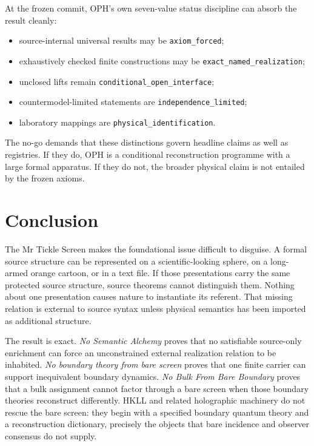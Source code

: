 \documentclass[10pt,a4paper]{article}
\theoremstyle{definition}
\theoremstyle{remark}
\begin{document}
At the frozen commit, OPH's own seven-value status discipline can absorb the
result cleanly:

\begin{itemize}
\item source-internal universal results may be \texttt{axiom\_forced};
\item exhaustively checked finite constructions may be
\texttt{exact\_named\_realization};
\item unclosed lifts remain \texttt{conditional\_open\_interface};
\item countermodel-limited statements are \texttt{independence\_limited};
\item laboratory mappings are \texttt{physical\_identification}.
\end{itemize}

The no-go demands that these distinctions govern headline claims as well as
registries.  If they do, OPH is a conditional reconstruction programme with a
large formal apparatus.  If they do not, the broader physical claim is not
entailed by the frozen axioms.

\section{Conclusion}

The Mr Tickle Screen makes the foundational issue difficult to disguise.  A
formal source structure can be represented on a scientific-looking sphere, on
a long-armed orange cartoon, or in a text file.  If those presentations carry
the same protected source structure, source theorems cannot distinguish them.
Nothing about one presentation causes nature to instantiate its referent.
That missing relation is external to source syntax unless physical semantics
has been imported as additional structure.

The result is exact.  \emph{No Semantic Alchemy} proves that no satisfiable
source-only enrichment can force an unconstrained external realization
relation to be inhabited.  \emph{No boundary theory from bare screen} proves
that one finite carrier can support inequivalent boundary dynamics.  \emph{No
Bulk From Bare Boundary} proves that a bulk assignment cannot factor through a
bare screen when those boundary theories reconstruct differently.  HKLL and
related holographic machinery do not rescue the bare screen: they begin with a
specified boundary quantum theory and a reconstruction dictionary, precisely
the objects that bare incidence and observer consensus do not supply.
\end{document}
